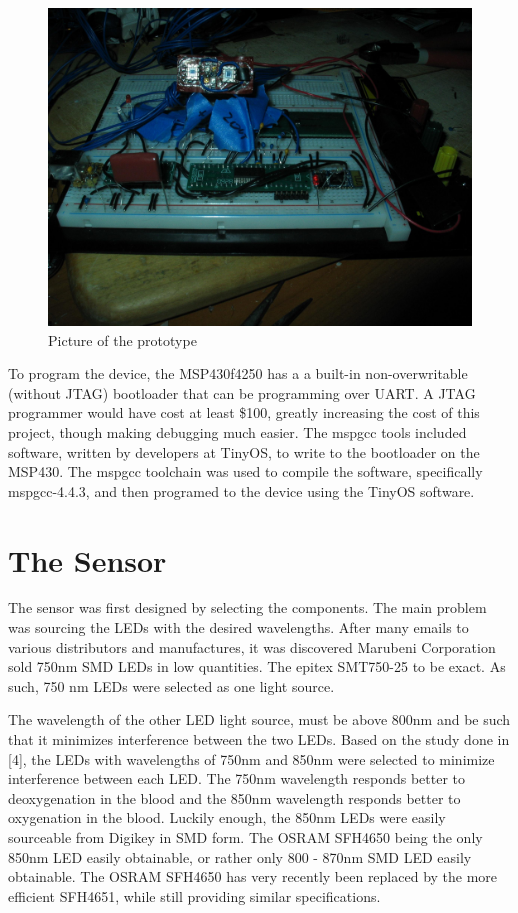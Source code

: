 \begin{figure}[htp]
\centering
\includegraphics[width=6in]{prototype.jpg}
\caption[The Prototype]{Picture of the prototype}
\end{figure}


To program the device, the MSP430f4250 has a a built-in non-overwritable (without JTAG) bootloader that can be programming over UART. A JTAG programmer would have cost at least \$100, greatly increasing the cost of this project, though making debugging much easier. The mspgcc tools included software, written by developers at TinyOS, to write to the bootloader on the MSP430. The mspgcc toolchain was used to compile the software, specifically mspgcc-4.4.3, and then programed to the device using the TinyOS software.

\section{The Sensor}

The sensor was first designed by selecting the components. The main problem was sourcing the LEDs with the desired wavelengths. After many emails to various distributors and manufactures, it was discovered Marubeni Corporation sold 750nm SMD LEDs in low quantities. The epitex SMT750-25 to be exact. As such, 750 nm LEDs were selected as one light source.

The wavelength of the other LED light source, must be above 800nm and be such that it minimizes interference between the two LEDs. Based on the study done in [4], the LEDs with wavelengths of 750nm and 850nm were selected to minimize interference between each LED. The 750nm wavelength responds better to deoxygenation in the blood and the 850nm wavelength responds better to oxygenation in the blood. Luckily enough, the 850nm LEDs were easily sourceable from Digikey in SMD form. The OSRAM SFH4650 being the only 850nm LED easily obtainable, or rather only 800 - 870nm SMD LED easily obtainable. The OSRAM SFH4650 has very recently been replaced by the more efficient SFH4651, while still providing similar specifications.

